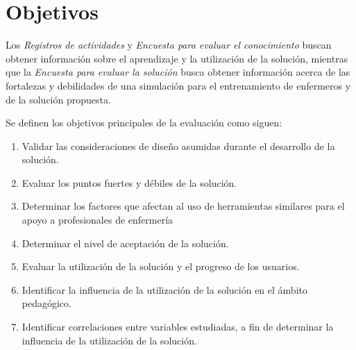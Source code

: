 
\section{Objetivos}
\label{sec:objetivos}

Los \emph{Registros de actividades} y \emph{Encuesta para evaluar el conocimiento} buscan obtener
información sobre el aprendizaje y la utilización de la solución, mientras que
la \emph{Encuesta para evaluar la solución} busca obtener información acerca de las fortalezas
y debilidades de una simulación para el entrenamiento de enfermeros y de la
solución propuesta.

Se definen los objetivos principales de la evaluación como siguen:

\begin{enumerate}

\item Validar las consideraciones de diseño asumidas durante el desarrollo de la solución.

\item Evaluar los puntos fuertes y débiles de la solución.

\item Determinar los factores que afectan al uso de herramientas similares para el
    apoyo a profesionales de enfermería
    
\item Determinar el nivel de aceptación de la solución.

\item Evaluar la utilización de la solución y el progreso de los usuarios.

\item Identificar la influencia de la utilización de la solución en el ámbito
    pedagógico.

\item Identificar correlaciones entre variables estudiadas, a fin de determinar
    la influencia de la utilización de la solución.
    
\end{enumerate}

